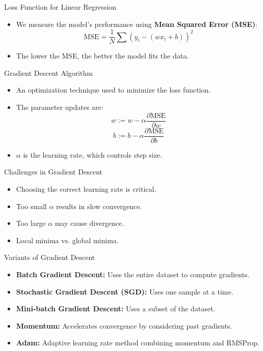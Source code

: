 \documentclass{beamer}
\begin{document}
\begin{frame}{Loss Function for Linear Regression}
    \begin{itemize}
        \item We measure the model's performance using \textbf{Mean Squared Error (MSE)}:
        \[
        \text{MSE} = \frac{1}{N} \sum (y_i - (wx_i + b))^2
        \]
        \item The lower the MSE, the better the model fits the data.
    \end{itemize}
\end{frame}

\begin{frame}{Gradient Descent Algorithm}
    \begin{itemize}
        \item An optimization technique used to minimize the loss function.
        \item The parameter updates are:
        \[
        w := w - \alpha \frac{\partial \text{MSE}}{\partial w}
        \]
        \[
        b := b - \alpha \frac{\partial \text{MSE}}{\partial b}
        \]
        \item \(\alpha\) is the learning rate, which controls step size.
    \end{itemize}
\end{frame}

\begin{frame}{Challenges in Gradient Descent}
    \begin{itemize}
        \item Choosing the correct learning rate is critical.
        \item Too small \(\alpha\) results in slow convergence.
        \item Too large \(\alpha\) may cause divergence.
        \item Local minima vs. global minima.
    \end{itemize}
\end{frame}

\begin{frame}{Variants of Gradient Descent}
    \begin{itemize}
        \item \textbf{Batch Gradient Descent:} Uses the entire dataset to compute gradients.
        \item \textbf{Stochastic Gradient Descent (SGD):} Uses one sample at a time.
        \item \textbf{Mini-batch Gradient Descent:} Uses a subset of the dataset.
        \item \textbf{Momentum:} Accelerates convergence by considering past gradients.
        \item \textbf{Adam:} Adaptive learning rate method combining momentum and RMSProp.
    \end{itemize}
\end{frame}
\end{document}
